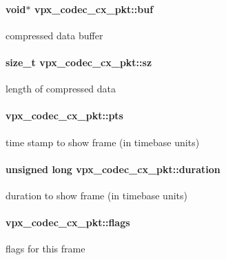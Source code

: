 \paragraph[{\texorpdfstring{buf}{buf}}]{\setlength{\rightskip}{0pt plus 5cm}void$\ast$ vpx\+\_\+codec\+\_\+cx\+\_\+pkt\+::buf}\hypertarget{structvpx__codec__cx__pkt_a9e1db068593b6037e70b05b5239784d2}{}\label{structvpx__codec__cx__pkt_a9e1db068593b6037e70b05b5239784d2}
compressed data buffer 
\paragraph[{\texorpdfstring{sz}{sz}}]{\setlength{\rightskip}{0pt plus 5cm}size\+\_\+t vpx\+\_\+codec\+\_\+cx\+\_\+pkt\+::sz}\hypertarget{structvpx__codec__cx__pkt_a857321ba2dc65e81c430d14c36a542d9}{}\label{structvpx__codec__cx__pkt_a857321ba2dc65e81c430d14c36a542d9}
length of compressed data 
\paragraph[{\texorpdfstring{pts}{pts}}]{ vpx\+\_\+codec\+\_\+cx\+\_\+pkt\+::pts}\hypertarget{structvpx__codec__cx__pkt_aa75fe039fe6b47fb25d20684864bef12}{}\label{structvpx__codec__cx__pkt_aa75fe039fe6b47fb25d20684864bef12}
time stamp to show frame (in timebase units) 
\paragraph[{\texorpdfstring{duration}{duration}}]{\setlength{\rightskip}{0pt plus 5cm}unsigned long vpx\+\_\+codec\+\_\+cx\+\_\+pkt\+::duration}\hypertarget{structvpx__codec__cx__pkt_afb8d9069980e759d97d2eb9fae7e5e06}{}\label{structvpx__codec__cx__pkt_afb8d9069980e759d97d2eb9fae7e5e06}
duration to show frame (in timebase units) 
\paragraph[{\texorpdfstring{flags}{flags}}]{ vpx\+\_\+codec\+\_\+cx\+\_\+pkt\+::flags}\hypertarget{structvpx__codec__cx__pkt_a3876fe0306342611465e9c15c6c4ae2f}{}\label{structvpx__codec__cx__pkt_a3876fe0306342611465e9c15c6c4ae2f}
flags for this frame 
